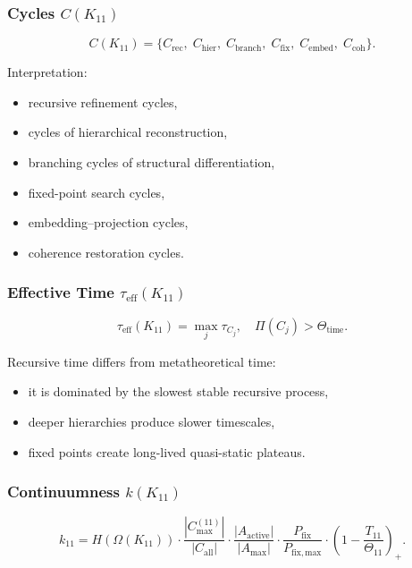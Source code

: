 \subsubsection{Cycles $C(K_{11})$}

\[
C(K_{11})=
\{
C_{\mathrm{rec}},\;
C_{\mathrm{hier}},\;
C_{\mathrm{branch}},\;
C_{\mathrm{fix}},\;
C_{\mathrm{embed}},\;
C_{\mathrm{coh}}
\}.
\]

Interpretation:
\begin{itemize}
    \item recursive refinement cycles,
    \item cycles of hierarchical reconstruction,
    \item branching cycles of structural differentiation,
    \item fixed-point search cycles,
    \item embedding–projection cycles,
    \item coherence restoration cycles.
\end{itemize}

\subsubsection{Effective Time $\tau_{\mathrm{eff}}(K_{11})$}

\[
\tau_{\mathrm{eff}}(K_{11})
=
\max_j \tau_{C_j},
\quad
\Pi(C_j)>\Theta_{\mathrm{time}}.
\]

Recursive time differs from metatheoretical time:
\begin{itemize}
    \item it is dominated by the slowest stable recursive process,
    \item deeper hierarchies produce slower timescales,
    \item fixed points create long-lived quasi-static plateaus.
\end{itemize}

\subsubsection{Continuumness $k(K_{11})$}

\[
k_{11}=
H(\Omega(K_{11}))
\cdot
\frac{|C_{\max}^{(11)}|}{|C_{\mathrm{all}}|}
\cdot
\frac{|A_{\mathrm{active}}|}{|A_{\max}|}
\cdot
\frac{P_{\mathrm{fix}}}{P_{\mathrm{fix,max}}}
\cdot
\left(1-\frac{T_{11}}{\Theta_{11}}\right)_+.
\]


